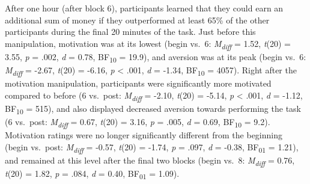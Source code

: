 \documentclass[11pt,english,]{memoir}
\begin{document}
After one hour (after block 6), participants learned that they could earn an additional sum of money if they outperformed at least 65\% of the other participants during the final 20 minutes of the task. Just before this manipulation, motivation was at its lowest (begin vs.~6: \emph{M\textsubscript{diff}} = 1.52, \emph{t}(20) = 3.55, \emph{p} = .002, \emph{d} = 0.78, BF\textsubscript{10} = 19.9), and aversion was at its peak (begin vs.~6: \emph{M\textsubscript{diff}} = -2.67, \emph{t}(20) = -6.16, \emph{p} \textless{} .001, \emph{d} = -1.34, BF\textsubscript{10} = 4057). Right after the motivation manipulation, participants were significantly more motivated compared to before (6 vs.~post: \emph{M\textsubscript{diff}} = -2.10, \emph{t}(20) = -5.14, \emph{p} \textless{} .001, \emph{d} = -1.12, BF\textsubscript{10} = 515), and also displayed decreased aversion towards performing the task (6 vs.~post: \emph{M\textsubscript{diff}} = 0.67, \emph{t}(20) = 3.16, \emph{p} = .005, \emph{d} = 0.69, BF\textsubscript{10} = 9.2). Motivation ratings were no longer significantly different from the beginning (begin vs.~post: \emph{M\textsubscript{diff}} = -0.57, \emph{t}(20) = -1.74, \emph{p} = .097, \emph{d} = -0.38, BF\textsubscript{01} = 1.21), and remained at this level after the final two blocks (begin vs.~8: \emph{M\textsubscript{diff}} = 0.76, \emph{t}(20) = 1.82, \emph{p} = .084, \emph{d} = 0.40, BF\textsubscript{01} = 1.09).
\end{document}
